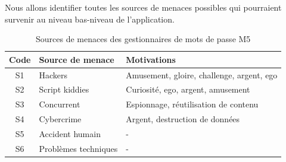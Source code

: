 Nous allons identifier toutes les sources de menaces possibles qui pourraient survenir au niveau bas-niveau de l'application. 

\begin{table}[H]
	\centering
	\begin{tabular}{cll}
		\hline
		Code & Source de menace                & Motivations                               \\ \hline
		S1   & Hackers & Amusement, gloire, challenge, argent, ego \\
		S2   & Script kiddies                  & Curiosité, ego, argent, amusement         \\
		S3   & Concurrent                      & Espionnage, réutilisation de contenu      \\
		S4   & Cybercrime                      & Argent, destruction de données            \\
		S5   & Accident humain                 & -                                         \\
		S6   & Problèmes techniques            & -                                         \\ \hline
	\end{tabular}
	\caption{Sources de menaces des gestionnaires de mots de passe M5}
\end{table}

